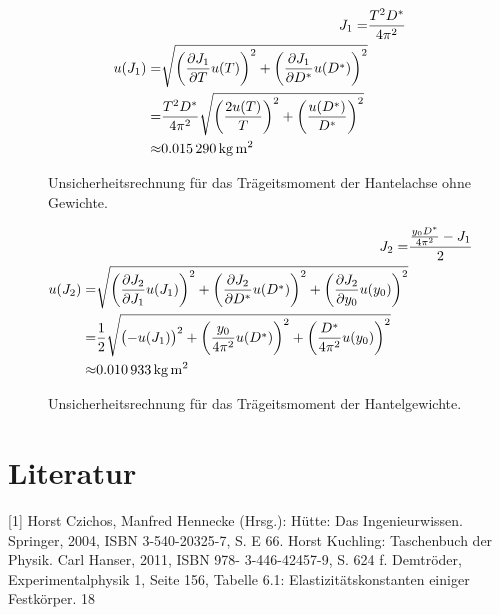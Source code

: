 \documentclass[11pt,a4paper,titlepage, ngerman]{article}
\begin{document}
	\begin{figure}[h]
		\centering
		\begin{align}
		J_1 =& \frac{T^2 D^*}{4\pi^2}\\
		\begin{split}
		\label{eq:hantel-J1-unc}
		u(J_1) =& \sqrt{\left( \pdv{J_1}{T} u(T) \right) ^2 + \left( \pdv{J_1}{D^*} u(D^*) \right) ^2}\\
		=& \frac{T^2 D^*}{4\pi^2} \sqrt{\left( \frac{2 u(T)}{T} \right) ^2 + \left( \frac{u(D^*)}{D^*} \right)^2}\\
		\approx & \SI{0,015290}{\kilogram\meter\squared}
		\end{split}
		\end{align}
		\caption{Unsicherheitsrechnung für das Trägeitsmoment der Hantelachse ohne Gewichte.}
	\end{figure}
	
	\begin{figure}[h]
		\centering
		\begin{align}
		J_2 =& \frac{\frac{y_0 D^*}{4 \pi^2} - J_1}{2}\\
		\begin{split}
		\label{eq:hantel-J2-unc}
		u(J_2) =& \sqrt{\left( \pdv{J_2}{J_1} u(J_1) \right) ^2 + \left( \pdv{J_2}{D^*} u(D^*) \right) ^2 + \left( \pdv{J_2}{y_0} u(y_0) \right) ^2}\\
		=& \frac{1}{2} \sqrt{\left( -u(J_1) \right) ^2 + \left( \frac{y_0}{4\pi^2} u(D^*) \right) ^2 + \left( \frac{D^*}{4\pi^2} u(y_0) \right) ^2}\\
		\approx & \SI{0,010933}{\kilogram\meter\squared}
		\end{split}
		\end{align}
		\caption{Unsicherheitsrechnung für das Trägeitsmoment der Hantelgewichte.}
	\end{figure}
	
	\section*{Literatur}
	
	[1] Horst Czichos, Manfred Hennecke (Hrsg.): Hütte: Das Ingenieurwissen.
	Springer, 2004, ISBN 3-540-20325-7, S. E 66. 
	\newline
	[2] Horst Kuchling: Taschenbuch der Physik. Carl Hanser, 2011, ISBN 978-
	3-446-42457-9, S. 624 f. 
	\newline
	[3] Demtröder, Experimentalphysik 1, Seite 156, Tabelle 6.1: Elastizitätskonstanten
	einiger Festkörper.
	18
\end{document}
